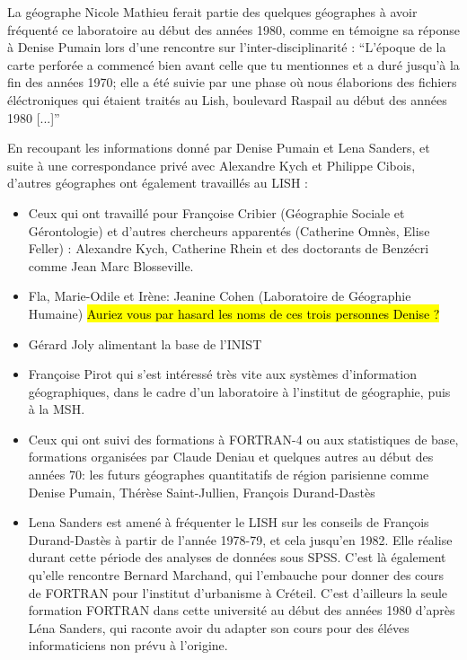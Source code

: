 La géographe Nicole Mathieu ferait partie des quelques géographes à avoir fréquenté ce laboratoire au début des années 1980, comme en témoigne sa réponse à Denise Pumain lors d'une rencontre sur l'inter-disciplinarité : \enquote{L'époque de la carte perforée a commencé bien avant celle que tu mentionnes et a duré jusqu'à la fin des années 1970; elle a été suivie par une phase où nous élaborions des fichiers éléctroniques qui étaient traités au Lish, boulevard Raspail au début des années 1980 [...]} \autocite[154]{Mathieu2014}

En recoupant les informations donné par Denise Pumain et Lena Sanders, et suite à une correspondance privé avec Alexandre Kych et Philippe Cibois, d'autres géographes ont également travaillés au LISH : 

\begin{itemize}[label=\textbullet]

\item Ceux qui ont travaillé pour Françoise Cribier (Géographie Sociale et Gérontologie) et d'autres chercheurs apparentés (Catherine Omnès, Elise Feller) : Alexandre Kych, Catherine Rhein et des doctorants de Benzécri comme Jean Marc Blosseville.

\item Fla, Marie-Odile et Irène: Jeanine Cohen (Laboratoire de Géographie Humaine) \hl{Auriez vous par hasard les noms de ces trois personnes Denise ?}

\item Gérard Joly alimentant la base de l'INIST

\item Françoise Pirot qui s'est intéressé très vite aux systèmes d'information géographiques, dans le cadre d'un laboratoire à l’institut de géographie, puis à la MSH.

\item Ceux qui ont suivi des formations à FORTRAN-4 ou aux statistiques de base, formations organisées par Claude Deniau et quelques autres au début des années 70: les futurs géographes quantitatifs de région parisienne comme Denise Pumain, Thérèse Saint-Jullien, François Durand-Dastès

\item Lena Sanders est amené à fréquenter le LISH sur les conseils de François Durand-Dastès à partir de l'année 1978-79, et cela jusqu'en 1982. Elle réalise durant cette période des analyses de données sous SPSS. C'est là également qu'elle rencontre Bernard Marchand, qui l'embauche pour donner des cours de FORTRAN pour l'institut d'urbanisme à Créteil. C'est d'ailleurs la seule formation FORTRAN dans cette université au début des années 1980 d'après Léna Sanders, qui raconte avoir du adapter son cours pour des éléves informaticiens non prévu à l'origine. 
\end{itemize}

